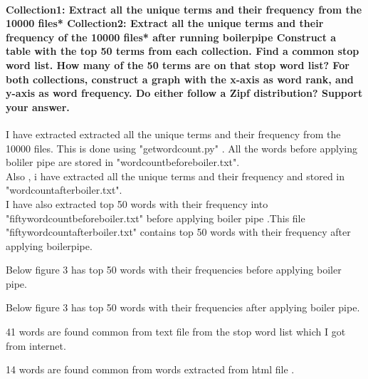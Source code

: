 \documentclass[12pt]{Report}
\begin{document}
\paragraph{Collection1: Extract all the unique terms and their frequency from the 10000 files*
Collection2: Extract all the unique terms and their frequency of the 10000 files* after running boilerpipe
Construct a table with the top 50 terms from each collection. 
Find a common stop word list.  How many of the 50 terms are on that stop word list?
For both collections, construct a graph with the x-axis as word rank, and y-axis as word frequency.  
Do either follow a Zipf distribution? Support your answer.
 }


I have extracted extracted all the unique terms and their frequency from the 10000 files. This is done using "getwordcount.py" . All the words before applying boliler pipe  are stored in "wordcountbeforeboiler.txt".\\

Also , i have extracted all the unique terms and their frequency and stored in "wordcountafterboiler.txt".\\

I have also extracted top 50 words with their frequency into "fiftywordcountbeforeboiler.txt" before applying boiler pipe .This file "fiftywordcountafterboiler.txt" contains top 50 words with their frequency after applying boilerpipe.



Below figure 3 has  top 50 words with their frequencies before applying boiler pipe.

Below figure 3 has top 50 words with their frequencies after applying boiler pipe.


41 words  are found common from text file from the stop word list which I got from internet. 

14  words are found common from words extracted from html file .
\end{document}
